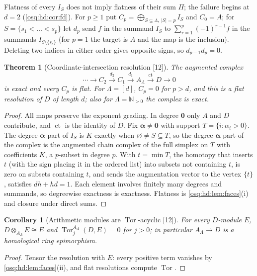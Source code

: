 \documentclass[11pt,letterpaper]{article}
\numberwithin{equation}{section}
\newtheorem{theorem}{Theorem}[section]
\newtheorem{corollary}[corollary]{Corollary}
\theoremstyle{definition}
\theoremstyle{remark}
\theoremstyle{plain}
\newcommand{\N}{\mathbb N}
\newcommand{\ct}{\operatorname{ct}}
\newcommand{\Tor}{\operatorname{Tor}}
\newcommand{\src}[1]{\textup{\textsf{[#1]}}}
\begin{document}
Flatness of every $I_S$ does not imply flatness of their sum $\Pi$; the failure begins at $d=2$
(\cref{osq:hd:cor:fd}). For $p\ge1$ put $C_p=\bigoplus_{S\subseteq\Lambda,\ |S|=p}I_S$ and $C_0=A$; for
$S=\{s_1<\dots<s_p\}$ let $d_p$ send $f$ in the summand $I_S$ to $\sum_{r=1}^p(-1)^{r-1}f$ in the summands
$I_{S\setminus\{s_r\}}$ (for $p=1$ the target is $A$ and the map is the inclusion). Deleting two indices in either
order gives opposite signs, so $d_{p-1}d_p=0$.

\begin{theorem}[Coordinate-intersection resolution \src{12}]\label{osq:hd:thm:resolution}
The augmented complex
\[
 \cdots\longrightarrow C_2\xrightarrow{d_2}C_1\xrightarrow{d_1}A_\Lambda\xrightarrow{\ct}D\longrightarrow0
\]
is exact and every $C_p$ is flat. For $\Lambda=[d]$, $C_p=0$ for $p>d$, and this is a flat resolution of $D$ of
length $d$; also for $\Lambda=\N_{>0}$ the complex is exact.
\end{theorem}
\begin{proof}
All maps preserve the exponent grading. In degree $\mathbf 0$ only $A$ and $D$ contribute, and $\ct$ is the identity
of $D$. Fix $\boldsymbol\alpha\ne\mathbf 0$ with support $T=\{i:\alpha_i>0\}$. The degree-$\boldsymbol\alpha$ part of
$I_S$ is $K$ exactly when $\varnothing\ne S\subseteq T$, so the degree-$\boldsymbol\alpha$ part of the complex is the
augmented chain complex of the full simplex on $T$ with coefficients $K$, a $p$-subset in degree $p$. With $t=\min T$,
the homotopy that inserts $t$ (with the sign placing it in the ordered list) into subsets not containing $t$, is zero on
subsets containing $t$, and sends the augmentation vector to the vertex $\{t\}$, satisfies $dh+hd=1$. Each element
involves finitely many degrees and summands, so degreewise exactness is exactness. Flatness is
\cref{osq:hd:lem:faces}(i) and closure under direct sums.
\end{proof}

\begin{corollary}[Arithmetic modules are $\Tor$-acyclic \src{12}]\label{osq:hd:cor:arithmeticTor}
For every $D$-module $E$, $D\otimes_{A_\Lambda}E\cong E$ and $\Tor^{A_\Lambda}_j(D,E)=0$ for $j>0$; in particular
$A_\Lambda\to D$ is a homological ring epimorphism.
\end{corollary}
\begin{proof}
Tensor the resolution with $E$: every positive term vanishes by \cref{osq:hd:lem:faces}(ii), and flat resolutions
compute $\Tor$.
\end{proof}
\end{document}
